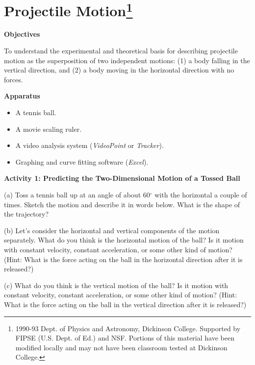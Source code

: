 
\section{Projectile Motion\footnote{
1990-93 Dept. of Physics and Astronomy, Dickinson College. Supported by FIPSE
(U.S. Dept. of Ed.) and NSF. Portions of this material have been modified locally
and may not have been classroom tested at Dickinson College.
}}

\makelabheader %

\textbf{Objectives }

To understand the experimental and theoretical basis for describing projectile
motion as the superposition of two independent motions: (1) a body falling in
the vertical direction, and (2) a body moving in the horizontal direction with
no forces.

\textbf{Apparatus}

\begin{itemize}
\item A tennis ball. 
\item A movie scaling ruler.
\item A video analysis system (\textit{VideoPoint} or \textit{Tracker}). 
\item Graphing and curve fitting software (\textit{Excel}).
\end{itemize}
\textbf{Activity 1: Predicting the Two-Dimensional Motion of a Tossed Ball }

(a) Toss a tennis ball up at an angle of about 60\( ^{\circ } \) with the horizontal
a couple of times. Sketch the motion and describe it in words below. What is
the shape of the trajectory?
\vspace{20mm}

(b) Let's consider the horizontal and vertical components of the motion separately.
What do you think is the horizontal motion of the ball? Is it motion with constant
velocity, constant acceleration, or some other kind of motion? (Hint: What
is the force acting on the ball in the horizontal direction after it is released?)
\vspace{20mm}

(c) What do you think is the vertical motion of the ball? Is it motion with
constant velocity, constant acceleration, or some other kind of motion?
(Hint: What is the force acting on the ball in the vertical direction after
it is released?)
\vspace{20mm}

